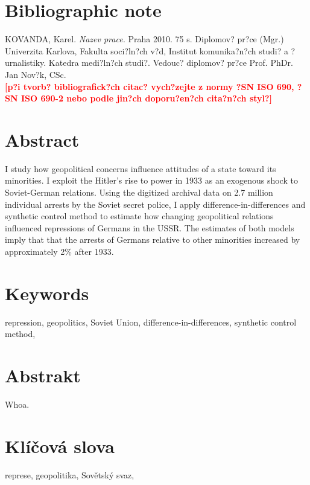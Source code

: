\pagestyle{empty}

\section*{Bibliographic note}

\noindent KOVANDA, Karel. \textit{Nazev prace.} Praha 2010. 75 s.
Diplomov? pr?ce (Mgr.) Univerzita Karlova, Fakulta soci?ln?ch v?d,
Institut komunika?n?ch studi? a ?urnalistiky. Katedra medi?ln?ch
studi?. Vedouc? diplomov? pr?ce Prof. PhDr. Jan Nov?k, CSc. \\
\textbf{\textcolor{red}{[p?i tvorb? bibliografick?ch citac?
vych?zejte z normy ?SN ISO 690, ?SN ISO 690-2 nebo podle jin?ch
doporu?en?ch cita?n?ch styl?]}}\\

\section*{Abstract}
  I study how geopolitical concerns influence attitudes of a state toward its minorities. I exploit the  Hitler's rise to power in 1933 as an exogenous shock to Soviet-German relations. 
    Using the digitized archival data on 2.7 million individual arrests by the Soviet secret police, I apply difference-in-differences and synthetic control method to estimate how changing geopolitical relations influenced repressions of Germans in the USSR. The estimates of both models imply that that the arrests of Germans relative to other minorities increased by approximately 2\% after 1933. 

\section*{Keywords}
repression, geopolitics, Soviet Union, difference-in-differences, synthetic control method, \\
\newpage

\section*{Abstrakt}
Whoa. \\




\section*{Klíčová slova}
represe, geopolitika, Sovětský svaz, \\

\newpage
